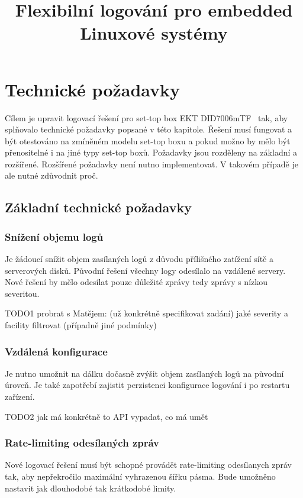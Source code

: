 \documentclass[thesis=B,czech]{FITthesis}[2012/06/26]
\title{Flexibilní logování pro embedded Linuxové systémy}
\begin{document}

\begin{introduction}

\end{introduction}

\chapter{Technické požadavky}
Cílem je upravit logovací řešení pro set-top box EKT DID7006mTF~\cite{ekt7006} tak, aby splňovalo technické požadavky popsané v této kapitole. Řešení musí fungovat a být otestováno na zmíněném modelu set-top boxu a pokud možno by mělo být přenositelné i na jiné typy set-top boxů.
Požadavky jsou rozděleny na základní a rozšířené. Rozšířené požadavky není nutno implementovat. V takovém případě je ale nutné zdůvodnit proč.

\section{Základní technické požadavky}

\subsection{Snížení objemu logů}
Je žádoucí snížit objem zasílaných logů z důvodu přílišného zatížení sítě a serverových disků. Původní řešení všechny logy odesílalo na vzdálené servery. Nové řešení by mělo odesílat pouze důležité zprávy tedy zprávy s nízkou severitou.

TODO1
probrat s Matějem: (už konkrétně specifikovat zadání) jaké severity a facility filtrovat (případně jiné podmínky)

\subsection{Vzdálená konfigurace}
Je nutno umožnit na dálku dočasně zvýšit objem zasílaných logů na původní úroveň. Je také zapotřebí zajistit perzistenci konfigurace logování i po restartu zařízení.

TODO2
jak má konkrétně to API vypadat, co má umět

\subsection{Rate-limiting odesílaných zpráv}
Nové logovací řešení musí být schopné provádět rate-limiting odesílanych zpráv tak, aby nepřekročilo maximální vyhrazenou šířku pásma. Bude umožněno nastavit jak dlouhodobé tak krátkodobé limity. 
\end{document}
